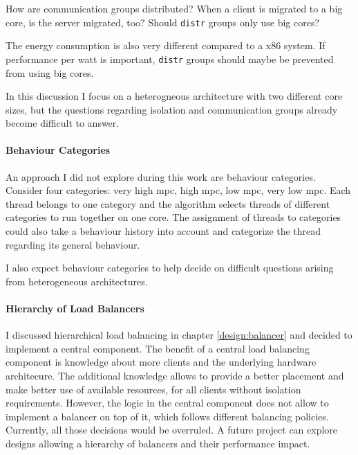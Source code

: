 How are communication groups distributed?
When a client is migrated to a big core, is the server migrated, too?
Should \texttt{distr} groups only use big cores?

The energy consumption is also very different compared to a x86 system.
If performance per watt is important, \texttt{distr} groups should maybe be
prevented from using big cores.

In this discussion I focus on a heterogneous architecture with two different
core sizes, but the questions regarding isolation and communication groups
already become difficult to answer.



\paragraph{Behaviour Categories}
An approach I did not explore during this work are behaviour categories.
Consider four categories: very high \gls{mpc}, high \gls{mpc}, low \gls{mpc},
very low \gls{mpc}.
Each thread belongs to one category and the algorithm selects threads of
different categories to run together on one core.
The assignment of threads to categories could also take a behaviour history
into account and categorize the thread regarding its general behaviour.

I also expect behaviour categories to help decide on difficult questions
arising from heterogeneous architectures.

\paragraph{Hierarchy of Load Balancers}
I discussed hierarchical load balancing in chapter \ref{design:balancer} and
decided to implement a central component.
The benefit of a central load balancing component is knowledge about more
clients and the underlying hardware architecure.
The additional knowledge allows to provide a better placement and make better
use of available resources, for all clients without isolation requirements.
However, the logic in the central component does not allow to implement a
balancer on top of it, which follows different balancing policies.
Currently, all those decisions would be overruled.
A future project can explore designs allowing a hierarchy of balancers and
their performance impact.

\begin{comment}
\paragraph{Workload-aware balancing}
The modular approach allows quick replacement and testing of different
algorithms in the various components.
If very specific workloads run on the system, tuned balancing algorithms for
this specific workload can be used to increase the performance of the system.
\end{comment}


\cleardoublepage

